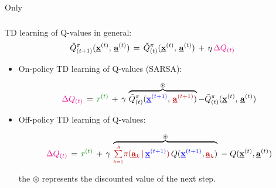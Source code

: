 \begin{frame}{Only} \frametitle{\subsecname}
	
	TD learning of Q-values in general:
	\begin{equation}
			\tilde{Q}^\pi_{(t+1)}(\vec x^{(t)},\, \vec a^{(t)} )
			\,= \,
			\tilde{Q}^\pi_{(t)} ( \vec x^{(t)},\, \vec a^{(t)} ) \, + \, \eta \, {\color{magenta}\Delta Q_{(t)}}
	\end{equation}
	
	
	
	\begin{itemize}
		\item<only@2> On-policy TD learning of Q-values (SARSA):
		
		\begin{equation}
				{\color{magenta}\Delta Q_{(t)}} \,=\, {\color{reward} r^{(t)}} \, + \, \gamma \, \overbrace{\tilde{Q}^\pi_{(t)} ({\color{trans}  \vec x^{(t+1)}},\,{\color{policy}  \vec a^{(t+1)}} )}^{\circledast} - \tilde{Q}^\pi_{(t)} ( \vec x^{(t)},\, \vec a^{(t)} )
				\label{eq:deltaqONpolicy}
		\end{equation}
		
		\item<only@2,3> Off-policy TD learning of Q-values:
		
		\slidesonly{\vspace{-5mm}}
		
		\begin{equation}
					{\color{magenta}\Delta Q_{(t)}} \,=\, {\color{reward}r^{(t)}} 
				 \, + \, \gamma \, \overbrace{{\color{policy}\smallsum{k=1}{A}
					\pi(\vec a_k \,|\, {\color{trans}\vec x^{(t+1)}})} \,
					Q({\color{trans}\vec x^{(t+1)}}, {\color{policy}\vec a_k})}^{\circledast} 
				\;-\; Q(\vec x^{(t)}, \vec a^{(t)})
				\label{eq:deltaqOFFpolicy}
		\end{equation}
		
		 the $\circledast$ represents the discounted value of the next step.
		

\end{itemize}
\end{frame}
